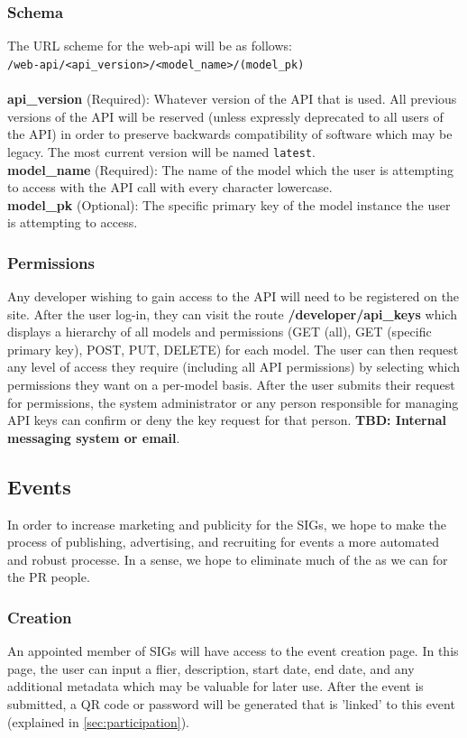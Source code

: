 \documentclass{article}
\begin{document}
\subsubsection{Schema}
The URL scheme for the web-api will be as follows:
\\ \texttt{/web-api/<api\_version>/<model\_name>/(model\_pk)}
\\
\\
\textbf{api\_version} (Required): Whatever version of the API that is used. All
previous versions of the API will be reserved (unless expressly deprecated to
all users of the API) in order to preserve backwards compatibility of software
which may be legacy. The most current version will be named \texttt{latest}.
\\
\textbf{model\_name} (Required): The name of the model which the user is
attempting to access with the API call with every character lowercase.
\\
\textbf{model\_pk} (Optional): The specific primary key of the model instance
the user is attempting to access. %

\subsubsection{Permissions}
Any developer wishing to gain access to the API will need to be registered on
the site. After the user log-in, they can visit the route
\textbf{/developer/api\_keys} which displays a hierarchy of all models and
permissions (GET (all), GET (specific primary key), POST, PUT, DELETE) for each
model. The user can then request any level of access they require (including
all API permissions) by selecting which permissions they want on a per-model
basis. After the user submits their request for permissions, the system
administrator or any person responsible for managing API keys can confirm or
deny the key request for that person. \textbf{TBD: Internal messaging system or
email}. %

\subsection{Events}
In order to increase marketing and publicity for the SIGs, we hope to make the
process of publishing, advertising, and recruiting for events a more automated
and robust processe. In a sense, we hope to eliminate much of the as we can
for the PR people.

\subsubsection{Creation}
An appointed member of SIGs will have access to the event creation page. In
this page, the user can input a flier, description, start date, end date, and any
additional metadata which may be valuable for later use. After the event is submitted,
a QR code or password will be generated that is 'linked' to this event (explained
in \ref{sec:participation}).
\end{document}
